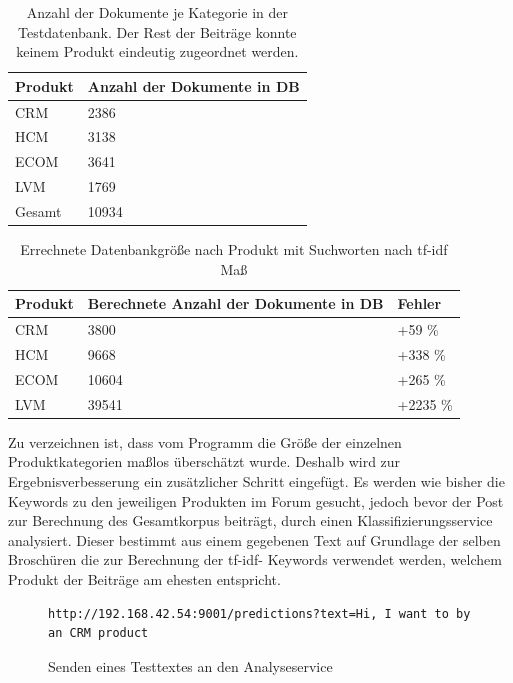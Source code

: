 \begin{table}[h!]
\centering 
\begin{tabular}{ | p{3cm} | l |}
\hline
Produkt & Anzahl der Dokumente in DB \\ \hline
CRM & 2386 \\ \hline
HCM & 3138 \\ \hline
ECOM & 3641 \\ \hline
LVM & 1769 \\ \hline
Gesamt & 10934 \\ \hline
\end{tabular}
\caption{Anzahl der Dokumente je Kategorie in der Testdatenbank. Der Rest der Beiträge konnte keinem Produkt eindeutig zugeordnet werden.}
\end{table}

\newpage

\begin{table}[h!]
\begin{tabular}{ | p{3cm} | l | l |}
\hline
Produkt & Berechnete Anzahl der Dokumente in DB & Fehler\\ \hline
CRM & 3800 & +59 \%\\ \hline
HCM & 9668 & +338 \% \\ \hline
ECOM & 10604 & +265 \%\\ \hline
LVM & 39541 & +2235 \%\\ \hline
\end{tabular}
\caption{Errechnete Datenbankgröße nach Produkt mit Suchworten nach tf-idf Maß}
\end{table}

Zu verzeichnen ist, dass vom Programm die Größe der einzelnen Produktkategorien maßlos überschätzt wurde. Deshalb wird zur Ergebnisverbesserung ein zusätzlicher Schritt eingefügt. Es werden wie bisher die Keywords zu den jeweiligen Produkten im Forum gesucht, jedoch bevor der Post zur Berechnung des Gesamtkorpus beiträgt, durch einen Klassifizierungsservice \cite{n2o} analysiert. Dieser bestimmt aus einem gegebenen Text auf Grundlage der selben Broschüren die zur Berechnung der tf-idf- Keywords verwendet werden, welchem Produkt der Beiträge am ehesten entspricht.

\begin{figure}[h!]
\begin{lstlisting}[language=HTML5]
http://192.168.42.54:9001/predictions?text=Hi, I want to by an CRM product
\end{lstlisting}
\caption{Senden eines Testtextes an den Analyseservice}
\end{figure}

